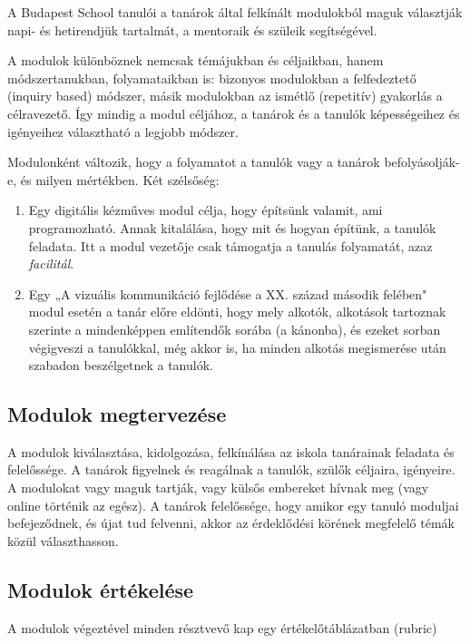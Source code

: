 A Budapest School tanulói a tanárok által felkínált modulokból maguk választják napi- és hetirendjük tartalmát, a mentoraik és szüleik segítségével.

A modulok különböznek nemcsak témájukban és céljaikban, hanem módszertanukban, folyamataikban is: bizonyos modulokban a felfedeztető (inquiry based) módszer, másik modulokban az ismétlő (repetitív) gyakorlás a célravezető. Így mindig a modul céljához, a tanárok és a tanulók képességeihez és igényeihez választható a legjobb módszer.

Modulonként változik, hogy a folyamatot a tanulók vagy a tanárok befolyásolják-e, és milyen mértékben. Két szélsőség:
\begin{enumerate}
\item Egy digitális kézműves modul célja, hogy építsünk valamit, ami programozható. Annak kitalálása, hogy mit és hogyan építünk, a tanulók feladata. Itt a modul vezetője csak támogatja a tanulás folyamatát, azaz \emph{facilitál}.

\item Egy „A vizuális kommunikáció fejlődése a XX. század második felében" modul esetén a tanár előre eldönti, hogy mely alkotók, alkotások tartoznak szerinte a mindenképpen említendők sorába (a kánonba), és ezeket sorban végigveszi a tanulókkal, még akkor is, ha minden alkotás megismerése után szabadon beszélgetnek a tanulók.
\end{enumerate}

\subsection{ Modulok megtervezése}

A modulok kiválasztása, kidolgozása, felkínálása az iskola tanárainak feladata és felelőssége. A tanárok figyelnek és reagálnak a tanulók, szülők céljaira, igényeire. A modulokat vagy maguk tartják, vagy külsős embereket hívnak meg (vagy online történik az egész). A tanárok felelőssége, hogy amikor egy tanuló moduljai befejeződnek, és újat tud felvenni, akkor az érdeklődési körének megfelelő témák közül választhasson.

\subsection{Modulok értékelése}
A modulok végeztével minden résztvevő kap egy értékelőtáblázatban (rubric)

